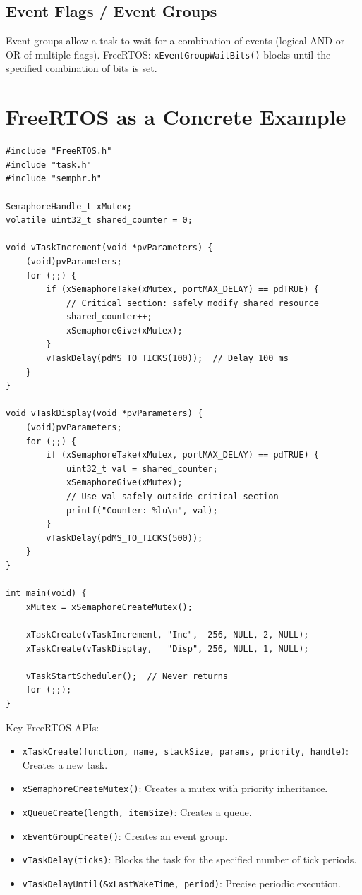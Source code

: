 \subsection{Event Flags / Event Groups}

Event groups allow a task to wait for a combination of events (logical AND or OR of multiple flags). FreeRTOS: \texttt{xEventGroupWaitBits()} blocks until the specified combination of bits is set.

\section{FreeRTOS as a Concrete Example}
\label{sec:mt:freertos}

\begin{lstlisting}[style=C, caption={FreeRTOS: two tasks sharing a resource with a mutex.}]
#include "FreeRTOS.h"
#include "task.h"
#include "semphr.h"

SemaphoreHandle_t xMutex;
volatile uint32_t shared_counter = 0;

void vTaskIncrement(void *pvParameters) {
    (void)pvParameters;
    for (;;) {
        if (xSemaphoreTake(xMutex, portMAX_DELAY) == pdTRUE) {
            // Critical section: safely modify shared resource
            shared_counter++;
            xSemaphoreGive(xMutex);
        }
        vTaskDelay(pdMS_TO_TICKS(100));  // Delay 100 ms
    }
}

void vTaskDisplay(void *pvParameters) {
    (void)pvParameters;
    for (;;) {
        if (xSemaphoreTake(xMutex, portMAX_DELAY) == pdTRUE) {
            uint32_t val = shared_counter;
            xSemaphoreGive(xMutex);
            // Use val safely outside critical section
            printf("Counter: %lu\n", val);
        }
        vTaskDelay(pdMS_TO_TICKS(500));
    }
}

int main(void) {
    xMutex = xSemaphoreCreateMutex();

    xTaskCreate(vTaskIncrement, "Inc",  256, NULL, 2, NULL);
    xTaskCreate(vTaskDisplay,   "Disp", 256, NULL, 1, NULL);

    vTaskStartScheduler();  // Never returns
    for (;;);
}
\end{lstlisting}

Key FreeRTOS APIs:
\begin{itemize}[nosep]
  \item \texttt{xTaskCreate(function, name, stackSize, params, priority, handle)}: Creates a new task.
  \item \texttt{xSemaphoreCreateMutex()}: Creates a mutex with priority inheritance.
  \item \texttt{xQueueCreate(length, itemSize)}: Creates a queue.
  \item \texttt{xEventGroupCreate()}: Creates an event group.
  \item \texttt{vTaskDelay(ticks)}: Blocks the task for the specified number of tick periods.
  \item \texttt{vTaskDelayUntil(\&xLastWakeTime, period)}: Precise periodic execution.
\end{itemize}

